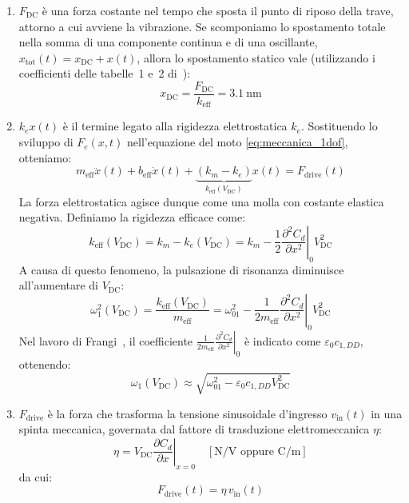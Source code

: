 \documentclass[11pt,a4paper]{article}
\begin{document}
\begin{enumerate}
    \item $F_{\text{DC}}$ è una forza costante nel tempo che sposta il punto di riposo della trave, attorno a cui avviene la vibrazione. Se scomponiamo lo spostamento totale nella somma di una componente continua e di una oscillante, $x_{\text{tot}}(t) = x_{\text{DC}} + x(t)$, allora lo spostamento statico vale (utilizzando i coefficienti delle tabelle~1 e~2 di~\cite{frangi2023}):
    \begin{equation}
        x_{\text{DC}} = \frac{F_{\text{DC}}}{k_{\text{eff}}} = \SI{3.1}{\nano\meter}
    \end{equation}
    \item $k_e x(t)$ è il termine legato alla rigidezza elettrostatica $k_e$. Sostituendo lo sviluppo di $F_e(x, t)$ nell'equazione del moto \eqref{eq:meccanica_1dof}, otteniamo:
    \begin{equation}
        \label{eq:moto_keff}
        m_{\text{eff}} \ddot{x}(t) + b_{\text{eff}} \dot{x}(t) + \underbrace{\left( k_m - k_e \right)}_{k_{\text{eff}}(V_{\text{DC}})} x(t) = F_{\text{drive}}(t)
    \end{equation}
    La forza elettrostatica agisce dunque come una molla con costante elastica negativa. Definiamo la rigidezza efficace come:
    \begin{equation}
        k_{\text{eff}}(V_{\text{DC}}) = k_m - k_e(V_{\text{DC}}) = k_m - \frac{1}{2} \left. \frac{\partial^2 C_d}{\partial x^2} \right|_0 V_{\text{DC}}^2
    \end{equation}
    \noindent A causa di questo fenomeno, la pulsazione di risonanza diminuisce all'aumentare di $V_{\text{DC}}$:
    \begin{equation}
        \omega_1^2(V_{\text{DC}}) = \frac{k_{\text{eff}}(V_{\text{DC}})}{m_{\text{eff}}} = \omega_{01}^2 - \frac{1}{2 m_{\text{eff}}} \left. \frac{\partial^2 C_d}{\partial x^2} \right|_0 V_{\text{DC}}^2
    \end{equation}
    \vspace{0.3cm}
    \noindent Nel lavoro di Frangi~\cite{frangi2023}, il coefficiente $\frac{1}{2 m_{\text{eff}}} \left. \frac{\partial^2 C_d}{\partial x^2} \right|_0$ è indicato come $\varepsilon_0 c_{1,DD}$, ottenendo:
    \begin{equation}
        \label{eq:softening}
        \omega_1(V_{\text{DC}}) \approx \sqrt{\omega_{01}^2 - \varepsilon_0 c_{1,DD} V_{\text{DC}}^2}
    \end{equation}
    \item $F_{\text{drive}}$ è la forza che trasforma la tensione sinusoidale d'ingresso $v_{\text{in}}(t)$ in una spinta meccanica, governata dal fattore di trasduzione elettromeccanica $\eta$:
    \begin{equation}
        \label{eq:eta_def}
        \eta = V_{\text{DC}} \left. \frac{\partial C_d}{\partial x} \right|_{x=0} \quad [\si{\newton/\volt} \text{ oppure } \si{\coulomb/\meter}]
    \end{equation}
    da cui:
    \begin{equation}
        F_{\text{drive}}(t) = \eta \, v_{\text{in}}(t)
    \end{equation}
\end{enumerate}
\end{document}
